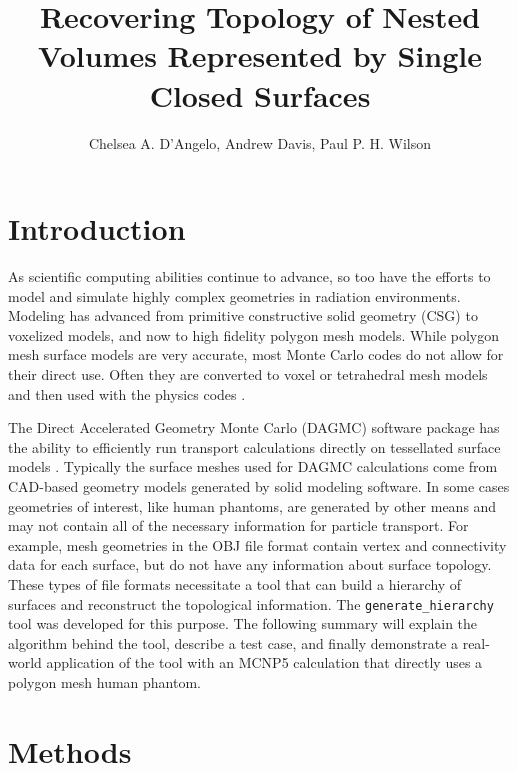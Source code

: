 \documentclass{anstrans}
\title{Recovering Topology of Nested Volumes Represented by Single Closed Surfaces}
\author{Chelsea A. D'Angelo, Andrew Davis, Paul P. H. Wilson}
\institute{
Computational Nuclear Engineering Research Group, University of Wisconsin-Madison, Madison WI}
\begin{document}
\section{Introduction}
As scientific computing abilities continue to advance, so too have the efforts to model
and simulate highly complex geometries in radiation environments.  Modeling has
advanced from primitive constructive solid geometry (CSG) to voxelized models, and now to high fidelity polygon mesh 
models.  While polygon mesh surface models are very accurate, most Monte Carlo codes
do not allow for their direct use. Often they are converted to voxel or tetrahedral 
mesh models and then used with the physics codes \cite{tetmesh}.

The Direct Accelerated Geometry Monte Carlo (DAGMC) software package
has the ability to efficiently run transport calculations directly on tessellated
surface models \cite{dagmc}.  Typically the surface meshes used for DAGMC 
calculations come from CAD-based geometry models generated by solid modeling software.
In some cases geometries of interest, like human phantoms, are generated by other 
means and may not contain all of the necessary information for particle transport. 
For example, mesh geometries in the OBJ file format contain vertex and connectivity
data for each surface, but do not have any information about surface topology.  
These types of file formats necessitate a tool that can build a hierarchy of 
surfaces and reconstruct the topological information.  The \texttt{generate\_hierarchy} 
tool\cite{genhi} was developed for this purpose.  The following summary will explain the algorithm
behind the tool, describe a test case, and finally demonstrate a real-world application
of the tool with an MCNP5 calculation that directly uses a polygon mesh human phantom.
\section{Methods}
\end{document}

